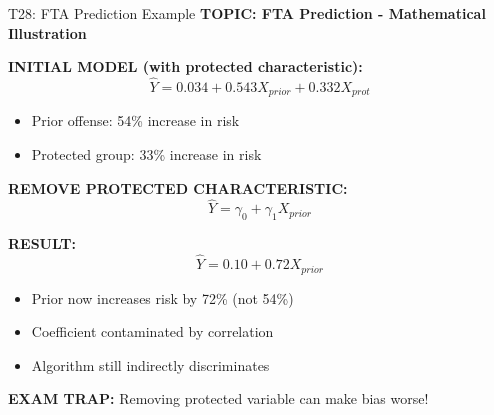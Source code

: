 \documentclass[8pt]{beamer}
\begin{document}
	\begin{frame}{T28: FTA Prediction Example}
		\fontsize{6.5}{7.5}\selectfont
		\textbf{TOPIC: FTA Prediction - Mathematical Illustration}
		
		\vspace{0.1cm}
		\textbf{INITIAL MODEL (with protected characteristic):}
		\[
		\hat{Y} = 0.034 + 0.543 X_{prior} + 0.332 X_{prot}
		\]
		\begin{itemize}
			\item Prior offense: 54\% increase in risk
			\item Protected group: 33\% increase in risk
		\end{itemize}
		
		\vspace{0.1cm}
		\textbf{REMOVE PROTECTED CHARACTERISTIC:}
		\[
		\hat{Y} = \gamma_0 + \gamma_1 X_{prior}
		\]
		
		\vspace{0.1cm}
		\textbf{RESULT:}
		\[
		\hat{Y} = 0.10 + 0.72 X_{prior}
		\]
		\begin{itemize}
			\item Prior now increases risk by 72\% (not 54\%)
			\item Coefficient contaminated by correlation
			\item Algorithm still indirectly discriminates
		\end{itemize}
		
		\textcolor{myred}{\textbf{EXAM TRAP:}} Removing protected variable \textcolor{myblue}{can make bias worse}!
	\end{frame}
	
\end{document}
